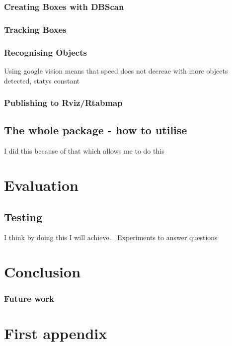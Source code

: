 \documentclass{mproj}
\begin{document}
\subsection{Creating Boxes with DBScan}
\subsection{Tracking Boxes}
\subsection{Recognising Objects}

Using google vision means that speed does not decreae with more objects detected, statys constant

\subsection{Publishing to Rviz/Rtabmap}
\section{The whole package - how to utilise}

I did this because of that which allows me to do this

\chapter{Evaluation}
\section{Testing}

I think by doing this I will achieve...
Experiments to answer questions

\chapter{Conclusion}\label{conclusion}
\subsection{Future work}

\appendix %
\chapter{First appendix}
\end{document}
